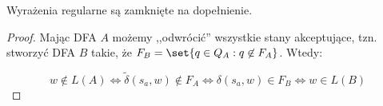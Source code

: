 \begin{theorem}
	Wyrażenia regularne są zamknięte na dopełnienie.
\end{theorem}
\begin{proof}
	Mając DFA \(A\) możemy ,,odwrócić'' wszystkie stany akceptujące, tzn. stworzyć DFA \(B\) takie, że \(F_B = \set{q \in Q_A : q \not \in F_A}\). Wtedy:

	\[
		w \not\in L(A) \iff \tilde \delta(s_a, w) \not \in F_A \iff \delta(s_a, w) \in F_B \iff w \in L(B)
	\]
\end{proof}
